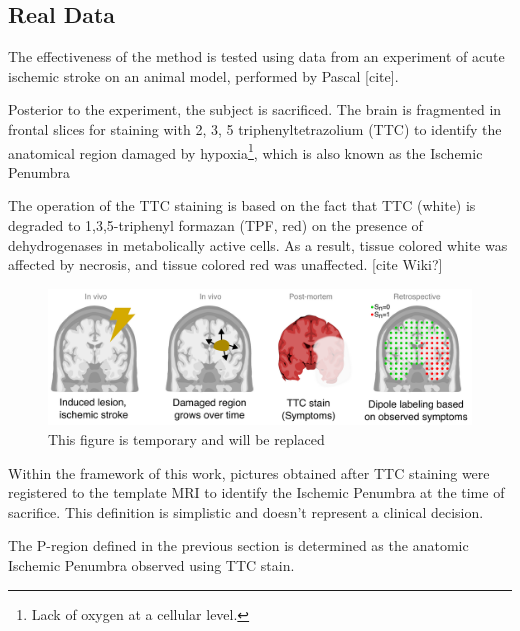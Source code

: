 \subsection{Real Data}

The effectiveness of the method is tested using data from an experiment 
of acute ischemic stroke on an animal model, performed by
Pascal [cite].

Posterior to the experiment, the subject is sacrificed.
%
The brain is fragmented in frontal slices for staining with
2, 3, 5 
triphenyltetrazolium (TTC)
to identify the anatomical region damaged by hypoxia\footnote{Lack of oxygen at a cellular level.}, which is also known as the Ischemic Penumbra

The operation of the TTC staining is based on the fact that TTC (white) 
is degraded to 1,3,5-triphenyl formazan (TPF, red)
on the presence of dehydrogenases in metabolically active cells.
%
As a result, tissue colored white was affected by necrosis, and tissue colored red was unaffected. 
[cite Wiki?]

\begin{figure}
\centering
\includegraphics[width=\linewidth]{./img_dev/motivation.pdf}
\caption{This figure is temporary and will be replaced}
\end{figure}

Within the framework of this work, pictures obtained after TTC staining were registered to the template MRI to identify the Ischemic Penumbra at the time of sacrifice.
%
This definition is simplistic and doesn't represent a clinical decision.

The P-region defined in the previous section is determined as the anatomic Ischemic Penumbra observed using TTC stain.





 



 




 


